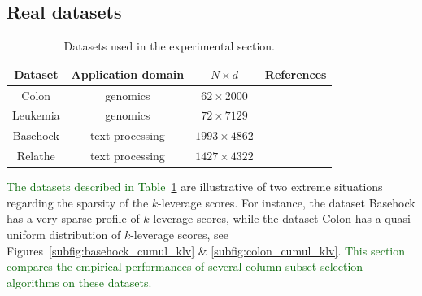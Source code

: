 \documentclass[twoside,11pt]{book}
\newcommand{\rev}[1]{\textcolor{darkgreen}{#1}}
\numberwithin{theorem}{chapter}
\numberwithin{definition}{chapter}
\numberwithin{proposition}{chapter}
\numberwithin{corollary}{chapter}
\numberwithin{example}{chapter}
\numberwithin{lemma}{chapter}
\numberwithin{assumption}{chapter}
\begin{document}


\subsection{Real datasets}
\label{s:realDatasets}

\begin{table}[h]
\centering
 \begin{tabular}{| c| c | c| c|}
 \hline
  Dataset & Application domain & $N \times d$  &  References\\
 \hline
 Colon & genomics & $62 \times 2000$  & \citep{Al99}\\
 \hline
 Leukemia & genomics &$72 \times 7129$ & \citep{Go99}\\
 \hline
 Basehock & text processing &$1993 \times 4862$ & \citep{Li17} \\
 \hline
 Relathe & text processing & $1427 \times 4322$ & \citep{Li17}\\
 \hline
\end{tabular}
\caption{Datasets used in the experimental section.
\label{table:real_datasets}}
\end{table}

\rev{The datasets described in Table~\ref{table:real_datasets}} are illustrative of two extreme situations regarding the sparsity of the $k$-leverage scores. For instance, the dataset Basehock has a very sparse profile of $k$-leverage scores, while the dataset Colon has a quasi-uniform distribution of $k$-leverage scores, see Figures~\ref{subfig:basehock_cumul_klv}  \& \ref{subfig:colon_cumul_klv}. \rev{This section compares the empirical performances of several column subset selection algorithms on these datasets.}
\end{document}
